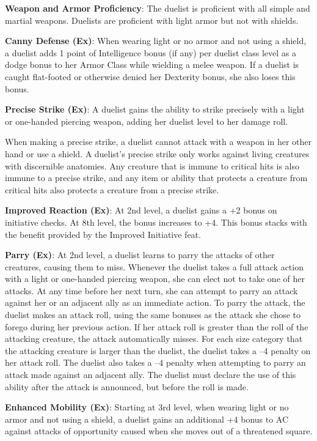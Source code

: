 \textbf{Weapon and Armor Proficiency}: The duelist is proficient with all simple and martial weapons. Duelists are proficient with light armor but not with shields.
				
\textbf{Canny Defense (Ex)}: When wearing light or no armor and not using a shield, a duelist adds 1 point of Intelligence bonus (if any) per duelist class level as a dodge bonus to her Armor Class while wielding a melee weapon. If a duelist is caught flat-footed or otherwise denied her Dexterity bonus, she also loses this bonus.
				
\textbf{Precise Strike (Ex)}: A duelist gains the ability to strike precisely with a light or one-handed piercing weapon, adding her duelist level to her damage roll.
				
When making a precise strike, a duelist cannot attack with a weapon in her other hand or use a shield. A duelist's precise strike only works against living creatures with discernible anatomies. Any creature that is immune to critical hits is also immune to a precise strike, and any item or ability that protects a creature from critical hits also protects a creature from a precise strike.
				
\textbf{Improved Reaction (Ex)}: At 2nd level, a duelist gains a +2 bonus on initiative checks. At 8th level, the bonus increases to +4. This bonus stacks with the benefit provided by the Improved Initiative feat.
				
\textbf{Parry (Ex)}: At 2nd level, a duelist learns to parry the attacks of other creatures, causing them to miss. Whenever the duelist takes a full attack action with a light or one-handed piercing weapon, she can elect not to take one of her attacks. At any time before her next turn, she can attempt to parry an attack against her or an adjacent ally as an immediate action. To parry the attack, the duelist makes an attack roll, using the same bonuses as the attack she chose to forego during her previous action. If her attack roll is greater than the roll of the attacking creature, the attack automatically misses. For each size category that the attacking creature is larger than the duelist, the duelist takes a --4 penalty on her attack roll. The duelist also takes a --4 penalty when attempting to parry an attack made against an adjacent ally. The duelist must declare the use of this ability after the attack is announced, but before the roll is made.
				
\textbf{Enhanced Mobility (Ex)}: Starting at 3rd level, when wearing light or no armor and not using a shield, a duelist gains an additional +4 bonus to AC against attacks of opportunity caused when she moves out of a threatened square.
				

